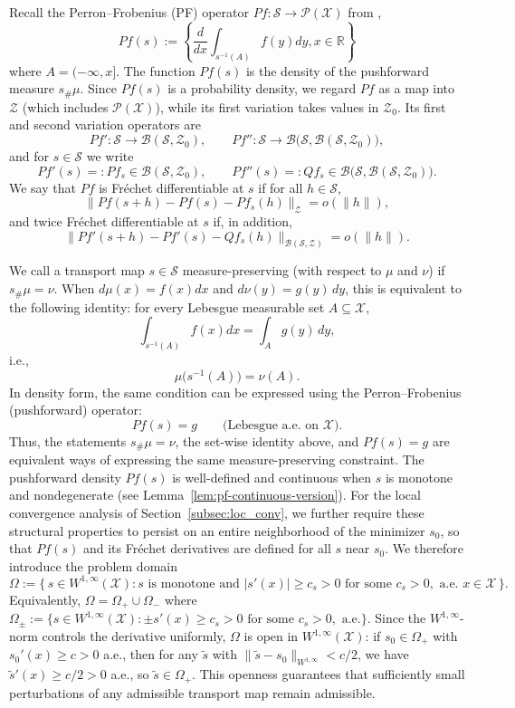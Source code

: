 \documentclass[12pt,leqno]{amsart}
\begin{document}
Recall the Perron--Frobenius (PF) operator $Pf:\mathcal{S}\rightarrow \mathcal{P}(\mathcal{X})$ from \cite{boyarsky2012laws},
\[
Pf(s) := \left\{\frac{d}{dx}\int_{s^{-1}(A)} f(y)dy , x\in \mathbb R \right\}
\]
where $A =(-\infty, x]$.  The function $Pf(s)$ is the density of the pushforward measure $s_{\#}\mu$. 
Since $Pf(s)$ is a probability density, we regard $Pf$ as a map into $\mathcal{Z}$ (which includes $\mathcal{P}(\mathcal{X})$), while its first variation takes values in $\mathcal{Z}_0$.
Its first and second variation operators are
\[
Pf':\mathcal{S}\to \mathcal{B}(\mathcal{S},\mathcal{Z}_0), \qquad Pf'':\mathcal{S}\to \mathcal{B}\!\big(\mathcal{S},\mathcal{B}(\mathcal{S},\mathcal{Z}_0)\big),
\]
and for $s\in\mathcal{S}$ we write
\[
Pf'(s)=:Pf_s\in \mathcal{B}(\mathcal{S},\mathcal{Z}_0), \qquad Pf''(s)=:Qf_s\in \mathcal{B}\!\big(\mathcal{S},\mathcal{B}(\mathcal{S},\mathcal{Z}_0)\big).
\]
We say that $Pf$ is Fr\'echet differentiable at $s$ if for all $h\in\mathcal{S}$,
\[
\|Pf(s+h)-Pf(s)-Pf_s(h)\|_{\mathcal{Z}}=o(\|h\|),
\]
and twice Fr\'echet differentiable at $s$ if, in addition,
\[
\|Pf'(s+h)-Pf'(s)-Qf_s(h)\|_{\mathcal{B}(\mathcal{S},\mathcal{Z})} =o(\|h\|).
\]

We call a transport map $s\in\mathcal{S}$ measure-preserving (with respect to $\mu$ and $\nu$) if $s_{\#}\mu=\nu$.
When $d\mu(x)=f(x)dx$ and $d\nu(y)=g(y)\,dy$, this is equivalent to the following identity: for every Lebesgue measurable set $A\subseteq \mathcal{X}$,
\[
\int_{s^{-1}(A)} f(x)dx = \int_A g(y)\,dy,
\]
i.e.,
\[
\mu\big(s^{-1}(A)\big)=\nu(A).
\]
In density form, the same condition can be expressed using the Perron--Frobenius (pushforward) operator:
\[
Pf(s) = g \qquad \text{(Lebesgue a.e. on $\mathcal{X}$)}.
\]
Thus, the statements $s_{\#}\mu=\nu$, the set-wise identity above, and $Pf(s) = g$ are equivalent ways of expressing the same measure-preserving constraint. The pushforward density $Pf(s)$ is well-defined and continuous when $s$ is monotone and nondegenerate  (see Lemma~\ref{lem:pf-continuous-version}). For the local convergence analysis of Section~\ref{subsec:loc_conv}, we further require these structural properties to persist on an entire neighborhood of the minimizer $s_0$, so that $Pf(s)$ and its Fr\'echet derivatives are defined for all $s$ near $s_0$. We therefore introduce the problem domain
\[
\Omega
:=
\bigl\{\, s \in W^{1,\infty}(\mathcal{X}) : s \text{ is monotone and } |s'(x)| \ge c_s > 0 \text{ for some } c_s>0, \text{ a.e.\ } x\in\mathcal{X} \,\bigr\}.
\]
Equivalently, $\Omega = \Omega_+\cup\Omega_-$ where $\Omega_\pm := \{s\in W^{1,\infty}(\mathcal{X}):\pm s'(x)\ge c_s>0 \text{ for some }c_s>0,\text{ a.e.}\}$. Since the $W^{1,\infty}$-norm controls the derivative uniformly, $\Omega$ is open in $W^{1,\infty}(\mathcal{X})$: if $s_0\in \Omega_+$ with $s_0'(x)\ge c>0$ a.e., then for any $\tilde s$ with $\|\tilde s-s_0\|_{W^{1,\infty}}<c/2$, we have $\tilde s'(x)\ge c/2>0$ a.e., so $\tilde s\in \Omega_+$.  This openness guarantees that sufficiently small perturbations of any admissible transport map remain admissible.
\end{document}
